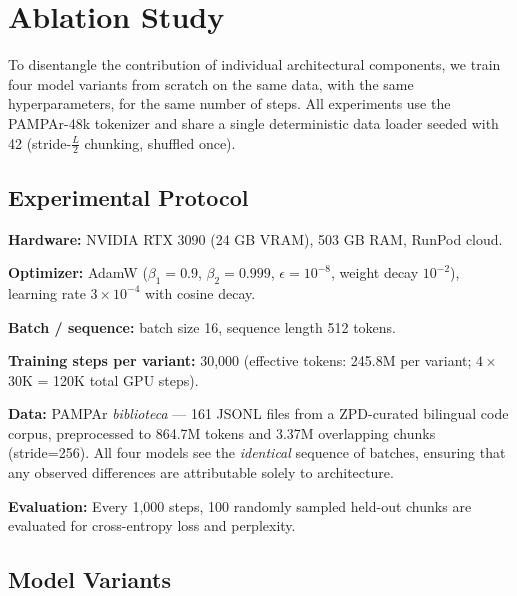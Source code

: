 \documentclass[11pt,a4paper]{article}
\begin{document}
\section{Ablation Study}
\label{sec:ablation}

To disentangle the contribution of individual architectural components, we
train four model variants from scratch on the same data, with the same
hyperparameters, for the same number of steps.  All experiments use the
PAMPAr-48k tokenizer and share a single deterministic data loader seeded with
42 (stride-$\frac{L}{2}$ chunking, shuffled once).

\subsection{Experimental Protocol}

\textbf{Hardware:} NVIDIA RTX 3090 (24 GB VRAM), 503 GB RAM, RunPod cloud.

\textbf{Optimizer:} AdamW ($\beta_1=0.9$, $\beta_2=0.999$, $\epsilon=10^{-8}$,
weight decay $10^{-2}$), learning rate $3 \times 10^{-4}$ with cosine decay.

\textbf{Batch / sequence:} batch size 16, sequence length 512 tokens.

\textbf{Training steps per variant:} 30,000 (effective tokens: 245.8M per
variant; $4 \times$ 30K = 120K total GPU steps).

\textbf{Data:} PAMPAr \emph{biblioteca} --- 161 JSONL files from a ZPD-curated
bilingual code corpus, preprocessed to 864.7M tokens and 3.37M overlapping
chunks (stride=256).  All four models see the \emph{identical} sequence of
batches, ensuring that any observed differences are attributable solely to
architecture.

\textbf{Evaluation:} Every 1,000 steps, 100 randomly sampled held-out chunks
are evaluated for cross-entropy loss and perplexity.

\subsection{Model Variants}
\end{document}

